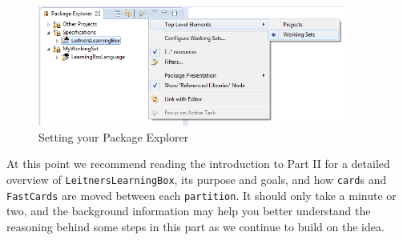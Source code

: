 \begin{itemize}
\vspace{0.5cm}

\begin{figure}[h!]
	\centering
  \includegraphics[width=0.9\textwidth]{eclipse_workingSets}
	\caption{Setting your Package Explorer}
	\label{fig:workingSets}
\end{figure}

\vspace{0.5cm}

At this point we recommend reading the introduction to Part II for a detailed overview of \texttt{LeitnersLearningBox}, its purpose and goals, and how
\texttt{card}s and \texttt{FastCards} are moved between each \texttt{partition}. It should only take a minute or two, and the background information may help
you better understand the reasoning behind some steps in this part as we continue to build on the idea.

\end{itemize}





